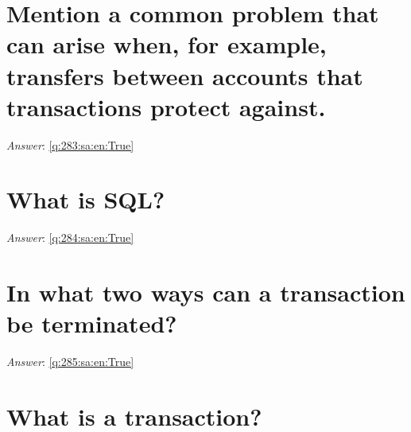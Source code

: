 \documentclass[a4paper,11pt,oneside]{book}
\begin{document}
\begin{sloppypar}
\section{Mention a common problem that can arise when, for example, transfers between accounts that transactions protect against.}

\label{q:283:sa:en:False}

\vspace{2cm}

\noindent\makebox[\textwidth]{\hrulefill}

\vspace{1cm}

\textit{Answer}: \autoref{q:283:sa:en:True}



\section{What is SQL?}

\label{q:284:sa:en:False}

\vspace{2cm}

\noindent\makebox[\textwidth]{\hrulefill}

\vspace{1cm}

\textit{Answer}: \autoref{q:284:sa:en:True}



\section{In what two ways can a transaction be terminated?}

\label{q:285:sa:en:False}

\vspace{2cm}

\noindent\makebox[\textwidth]{\hrulefill}

\vspace{1cm}

\textit{Answer}: \autoref{q:285:sa:en:True}



\section{What is a transaction?}

\label{q:286:sa:en:False}

\vspace{2cm}


\end{sloppypar}
\end{document}
